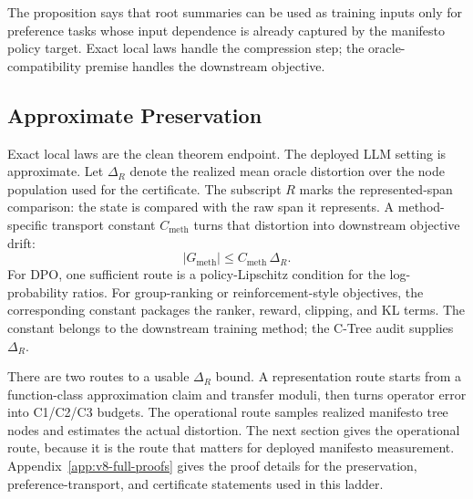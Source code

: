 The proposition says that root summaries can be used as training inputs only
for preference tasks whose input dependence is already captured by the
manifesto policy target. Exact local laws handle the compression step; the
oracle-compatibility premise handles the downstream objective.

\subsection{Approximate Preservation}

Exact local laws are the clean theorem endpoint. The deployed LLM setting is
approximate. Let \(\Delta_R\) denote the realized mean oracle distortion over
the node population used for the certificate. The subscript \(R\) marks the
represented-span comparison: the state is compared with the raw span it
represents. A method-specific transport constant \(C_{\mathrm{meth}}\) turns
that distortion into downstream objective drift:
\begin{equation}
\label{eq:v8-population-gap}
  |G_{\mathrm{meth}}|
  \le
  C_{\mathrm{meth}}\,\Delta_R .
\end{equation}
For DPO, one sufficient route is a policy-Lipschitz condition for the
log-probability ratios. For group-ranking or reinforcement-style objectives,
the corresponding constant packages the ranker, reward, clipping, and KL
terms. The constant belongs to the downstream training method; the C-Tree audit
supplies \(\Delta_R\).

There are two routes to a usable \(\Delta_R\) bound. A representation route
starts from a function-class approximation claim and transfer moduli, then
turns operator error into C1/C2/C3 budgets. The operational route samples
realized manifesto tree nodes and estimates the actual distortion. The next
section gives the operational route, because it is the route that matters for
deployed manifesto measurement. Appendix~\ref{app:v8-full-proofs} gives the
proof details for the preservation, preference-transport, and certificate
statements used in this ladder.
